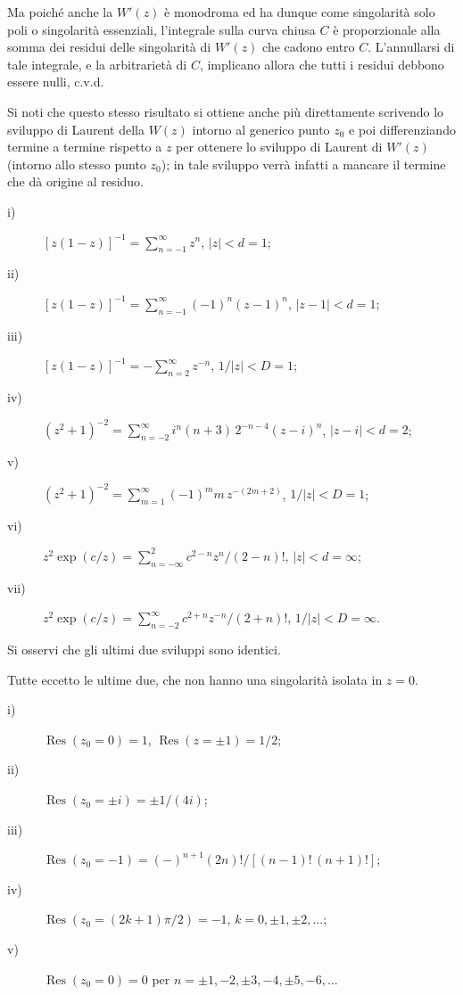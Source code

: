 \documentclass[11pt, a4paper]{book}
\numberwithin{equation}{section}
\begin{document}
\begin{description}
Ma poiché anche la $W'(z)$ è monodroma ed ha dunque come singolarità solo poli o singolarità essenziali, l'integrale sulla curva chiusa $C$ è proporzionale alla somma dei residui delle singolarità di $W'(z)$ che cadono entro $C$. L'annullarsi di tale integrale, e la arbitrarietà di $C$, implicano allora che tutti i residui debbono essere nulli, c.v.d.

Si noti che questo stesso risultato si ottiene anche più direttamente scrivendo lo sviluppo di Laurent della $W(z)$ intorno al generico punto $z_0$ e poi differenziando termine a termine rispetto a $z$ per ottenere lo sviluppo di Laurent di $W'(z)$ (intorno allo stesso punto $z_0$); in tale sviluppo verrà infatti a mancare il termine che dà origine al residuo.

\item[6-2]
\begin{description}
\item[i)] $[z(1-z)]^{-1} = \displaystyle\sum_{n=-1}^{\infty} z^n$, \quad $|z| < d = 1$;
\item[ii)] $[z(1-z)]^{-1} = \displaystyle\sum_{n=-1}^{\infty} (-1)^n (z-1)^n$, \quad $|z-1| < d = 1$;
\item[iii)] $[z(1-z)]^{-1} = -\displaystyle\sum_{n=2}^{\infty} z^{-n}$, \quad $1/|z| < D = 1$;
\item[iv)] $(z^2+1)^{-2} = \displaystyle\sum_{n=-2}^{\infty} i^n(n+3)\,2^{-n-4}(z-i)^n$, \quad $|z-i| < d = 2$;
\item[v)] $(z^2+1)^{-2} = \displaystyle\sum_{m=1}^{\infty} (-1)^m m\, z^{-(2m+2)}$, \quad $1/|z| < D = 1$;
\item[vi)] $z^2 \exp(c/z) = \displaystyle\sum_{n=-\infty}^{2} c^{2-n} z^n / (2-n)!$, \quad $|z| < d = \infty$;
\item[vii)] $z^2 \exp(c/z) = \displaystyle\sum_{n=-2}^{\infty} c^{2+n} z^{-n}/(2+n)!$, \quad $1/|z| < D = \infty$.
\end{description}
Si osservi che gli ultimi due sviluppi sono identici.

\item[6-3] Tutte eccetto le ultime due, che non hanno una singolarità isolata in $z=0$.

\item[6-4]
\begin{description}
\item[i)] $\operatorname{Res}(z_0 = 0) = 1$, \quad $\operatorname{Res}(z = \pm 1) = 1/2$;
\item[ii)] $\operatorname{Res}(z_0 = \pm i) = \pm 1/(4i)$;
\item[iii)] $\operatorname{Res}(z_0 = -1) = (-)^{n+1}(2n)!/\left[(n-1)!\,(n+1)!\right]$;
\item[iv)] $\operatorname{Res}(z_0 = (2k+1)\pi/2) = -1$, \quad $k = 0, \pm 1, \pm 2, \ldots$;
\item[v)] $\operatorname{Res}(z_0 = 0) = 0$ \quad per $n = \pm 1, -2, \pm 3, -4, \pm 5, -6, \ldots$
\end{description}


\end{description}
\end{document}
